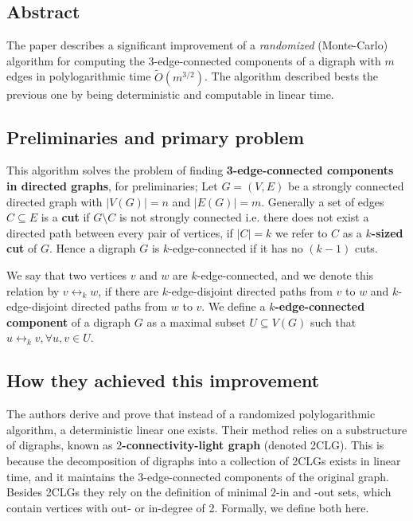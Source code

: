 \subsection{Abstract}
The paper describes a significant improvement of a \textit{randomized} (Monte-Carlo) algorithm for computing the 3-edge-connected components of a digraph
with $m$ edges in polylogarithmic time $\widetilde{O} (m^{3/2})$. The algorithm described bests the previous one by being deterministic and 
computable in linear time. 

\vspace*{0.5cm}

\subsection{Preliminaries and primary problem}
This algorithm solves the problem of finding \textbf{3-edge-connected components in directed graphs}, for preliminaries; Let $G = (V,E)$
be a strongly connected directed graph with $|V(G)| =n$ and  $|E(G)| =m$. Generally a set of edges $C \subseteq E$ is a \textbf{cut} if $G \setminus C$ is not
strongly connected i.e. there does not exist a directed path between every pair of vertices, if $|C| =k$ we refer to $C$ as a \textbf{$k$-sized cut} of $G$.
Hence a digraph $G$ is $k$-edge-connected if it has no $(k-1)$ cuts. 

\vspace*{0.2cm}

We say that two vertices $v$ and $w$ are $k$-edge-connected, and we denote this relation by $v \leftrightarrow_k w$, if there are $k$-edge-disjoint 
directed paths from $v$ to $w$ and $k$-edge-disjoint directed paths from $w$ to $v$.
We define a \textbf{$k$-edge-connected component} of a digraph $G$ as a maximal subset $U \subseteq V(G)$ such that $u \leftrightarrow_k v, \forall u,v \in U$.

\subsection{How they achieved this improvement}
The authors derive and prove that instead of a randomized polylogarithmic algorithm, a deterministic linear one exists. Their method relies on a substructure
of digraphs, known as \textbf{$2$-connectivity-light graph} (denoted 2CLG). This is because the decomposition of digraphs into a collection of 2CLGs exists
in linear time, and it maintains the $3$-edge-connected components of the original graph. Besides 2CLGs they rely on the definition of minimal
$2$-in and -out sets, which contain vertices with out- or in-degree of 2. Formally, we define both here.

